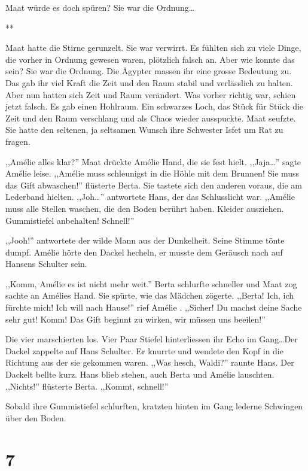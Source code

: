 \documentclass[11pt,titlepage,a5paper]{book}
\newcommand{\sterne}{\par{\centering ***\par}}
\newcommand{\am}{Amélie }
\begin{document}
Maat würde es doch spüren? Sie war die Ordnung\dots

\sterne

Maat hatte die Stirne gerunzelt. Sie war verwirrt. Es fühlten sich zu viele Dinge, die vorher in Ordnung gewesen waren, plötzlich falsch an. Aber wie konnte das sein? Sie war die Ordnung. Die Ägypter massen ihr eine grosse Bedeutung zu. Das gab ihr viel Kraft die Zeit und den Raum stabil und verlässlich zu halten. Aber nun hatten sich Zeit und Raum verändert. Was vorher richtig war, schien jetzt falsch. Es gab einen Hohlraum. Ein schwarzes Loch, das Stück für Stück die Zeit und den Raum verschlang und als Chaos wieder ausspuckte. Maat seufzte. Sie hatte den seltenen, ja seltsamen Wunsch ihre Schwester Isfet um Rat zu fragen.

,,\am alles klar?'' Maat drückte \am Hand, die sie fest hielt. ,,Jaja\dots '' sagte \am leise. ,,\am muss schleunigst in die Höhle mit dem Brunnen! Sie muss das Gift abwaschen!'' flüsterte Berta. Sie tastete sich den anderen voraus, die am Lederband hielten. ,,Joh\dots '' antwortete Hans, der das Schlusslicht war. ,,\am muss alle Stellen waschen, die den Boden berührt haben. Kleider ausziehen. Gummistiefel anbehalten! Schnell!''

,,Jooh!'' antwortete der wilde Mann aus der Dunkelheit. Seine Stimme tönte dumpf. \am hörte den Dackel hecheln, er musste dem Geräusch nach auf Hansens Schulter sein.

,,Komm, \am es ist nicht mehr weit.''  Berta schlurfte schneller und Maat zog sachte an Amélies Hand. Sie spürte, wie das Mädchen zögerte. ,,Berta! Ich, ich fürchte mich! Ich will nach Hause!'' rief \am. ,,Sicher! Du machst deine Sache sehr gut! Komm! Das Gift beginnt zu wirken, wir müssen uns beeilen!''

Die vier marschierten los. Vier Paar Stiefel hinterliessen ihr Echo im Gang\dots Der Dackel zappelte auf Hans Schulter. Er knurrte und wendete den Kopf in die Richtung aus der sie gekommen waren. ,,Was hesch, Waldi?'' raunte Hans. Der Dackelt bellte kurz. Hans blieb stehen, auch Berta und \am lauschten. ,,Nichts!'' flüsterte Berta. ,,Kommt, schnell!''

Sobald ihre Gummistiefel schlurften, kratzten hinten im Gang lederne Schwingen über den Boden.

\section*{7}
\end{document}
